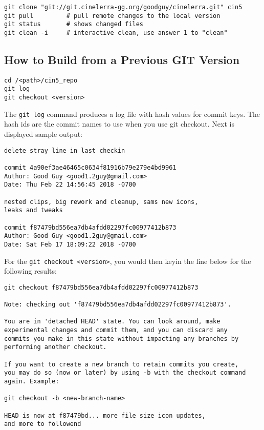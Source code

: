 \begin{lstlisting}[style=sh]
git clone "git://git.cinelerra-gg.org/goodguy/cinelerra.git" cin5
git pull         # pull remote changes to the local version
git status       # shows changed files
git clean -i     # interactive clean, use answer 1 to "clean"
\end{lstlisting}


\subsection{How to Build from a Previous GIT Version}%
\label{sub:how_to_build_from_a_previous_git_version}

\strut
%
\begin{lstlisting}[style=sh]
cd /<path>/cin5_repo
git log
git checkout <version>
\end{lstlisting}

The \texttt{git log} command produces a log file with hash values
for commit keys. The hash ids are the commit names to use when you
use git checkout. Next is displayed sample output:

\begin{lstlisting}[style=nil]
delete stray line in last checkin

commit 4a90ef3ae46465c0634f81916b79e279e4bd9961
Author: Good Guy <good1.2guy@gmail.com>
Date: Thu Feb 22 14:56:45 2018 -0700

nested clips, big rework and cleanup, sams new icons,
leaks and tweaks

commit f87479bd556ea7db4afdd02297fc00977412b873
Author: Good Guy <good1.2guy@gmail.com>
Date: Sat Feb 17 18:09:22 2018 -0700
\end{lstlisting}

For the \texttt{git checkout <version>}, you would then keyin the
line below for the following results:

\begin{lstlisting}[style=nil]
git checkout f87479bd556ea7db4afdd02297fc00977412b873

Note: checking out 'f87479bd556ea7db4afdd02297fc00977412b873'.

You are in 'detached HEAD' state. You can look around, make
experimental changes and commit them, and you can discard any
commits you make in this state without impacting any branches by
performing another checkout.

If you want to create a new branch to retain commits you create,
you may do so (now or later) by using -b with the checkout command
again. Example:

git checkout -b <new-branch-name>

HEAD is now at f87479bd... more file size icon updates,
and more to followend
\end{lstlisting}

